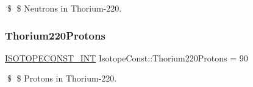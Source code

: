 \$ \$ Neutrons in Thorium-\/220. \mbox{\label{group___isotope_const-_thorium-_th220_ga35957b68378821a9b3b7eed8641485a5}} 
\subsubsection{\texorpdfstring{Thorium220\+Protons}{Thorium220Protons}}
{\footnotesize\ttfamily \mbox{\hyperlink{group___isotope_const-_macros_ga5f18360b3e99483a35c32d789e62621c}{I\+S\+O\+T\+O\+P\+E\+C\+O\+N\+S\+T\+\_\+\+I\+NT}} Isotope\+Const\+::\+Thorium220\+Protons = 90}

\$ \$ Protons in Thorium-\/220. 
